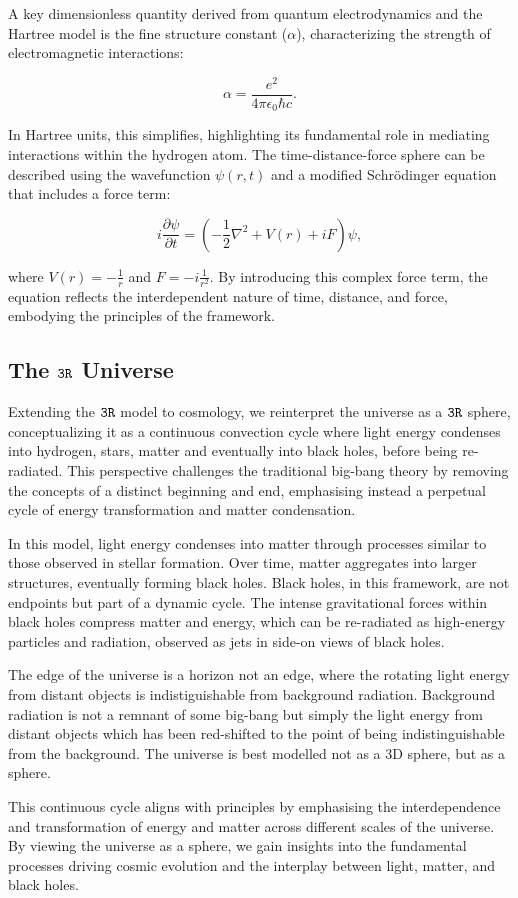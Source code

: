 \documentclass[12pt]{article}
\begin{document}
A key dimensionless quantity derived from quantum electrodynamics and the Hartree model is the fine structure constant (\(\alpha\)), characterizing the strength of electromagnetic interactions:

\[
    \alpha = \frac{e^2}{4\pi \epsilon_0 \hbar c}.
\]

In Hartree units, this simplifies, highlighting its fundamental role in mediating interactions within the hydrogen atom. The time-distance-force sphere can be described using the wavefunction \(\psi(r, t)\) and a modified Schrödinger equation that includes a force term:

\[
    i \frac{\partial \psi}{\partial t} = \left( -\frac{1}{2} \nabla^2 + V(r) + iF \right) \psi,
\]

where \(V(r) = -\frac{1}{r}\) and \(F = -i \frac{1}{r^2}\). By introducing this complex force term, the equation reflects the interdependent nature of time, distance, and force, embodying the principles of the \iR{} framework.

\subsection*{The \(\texttt{3R}\) Universe}

Extending the \(\texttt{3R}\) model to cosmology, we reinterpret the universe as a \(\texttt{3R}\) sphere, conceptualizing it as a continuous convection cycle where light energy condenses into hydrogen, stars, matter and eventually into black holes, before being re-radiated. This perspective challenges the traditional big-bang theory by removing the concepts of a distinct beginning and end, emphasising instead a perpetual cycle of energy transformation and matter condensation.

In this model, light energy condenses into matter through processes similar to those observed in stellar formation. Over time, matter aggregates into larger structures, eventually forming black holes. Black holes, in this framework, are not endpoints but part of a dynamic cycle. The intense gravitational forces within black holes compress matter and energy, which can be re-radiated as high-energy particles and radiation, observed as jets in side-on views of black holes.

The edge of the universe is a horizon not an edge, where the rotating light energy from distant objects is indistiguishable from background radiation. Background radiation is not a remnant of some big-bang but simply the light energy from distant objects which has been red-shifted to the point of being indistinguishable from the background. The universe is best modelled not as a 3D sphere, but as a \iR{} sphere.

This continuous cycle aligns with \iR{} principles by emphasising the interdependence and transformation of energy and matter across different scales of the universe. By viewing the universe as a \iR{} sphere, we gain insights into the fundamental processes driving cosmic evolution and the interplay between light, matter, and black holes.
\end{document}
